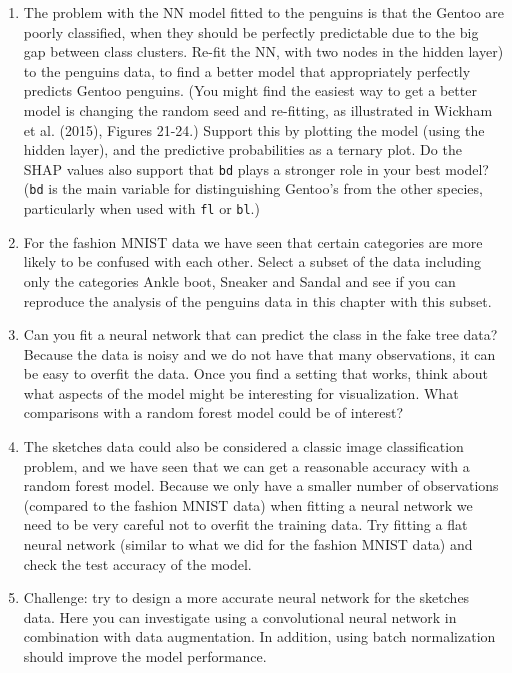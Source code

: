 \documentclass[
  letterpaper,
]{krantz}
\providecommand{\tightlist}{%
  \setlength{\itemsep}{0pt}\setlength{\parskip}{0pt}}
\begin{document}
\begin{enumerate}
\def\labelenumi{\arabic{enumi}.}
\tightlist
\item
  The problem with the NN model fitted to the penguins is that the
  Gentoo are poorly classified, when they should be perfectly
  predictable due to the big gap between class clusters. Re-fit the NN,
  with two nodes in the hidden layer) to the penguins data, to find a
  better model that appropriately perfectly predicts Gentoo penguins.
  (You might find the easiest way to get a better model is changing the
  random seed and re-fitting, as illustrated in Wickham et al. (2015),
  Figures 21-24.) Support this by plotting the model (using the hidden
  layer), and the predictive probabilities as a ternary plot. Do the
  SHAP values also support that \texttt{bd} plays a stronger role in
  your best model? (\texttt{bd} is the main variable for distinguishing
  Gentoo's from the other species, particularly when used with
  \texttt{fl} or \texttt{bl}.)
\item
  For the fashion MNIST data we have seen that certain categories are
  more likely to be confused with each other. Select a subset of the
  data including only the categories Ankle boot, Sneaker and Sandal and
  see if you can reproduce the analysis of the penguins data in this
  chapter with this subset.
\item
  Can you fit a neural network that can predict the class in the fake
  tree data? Because the data is noisy and we do not have that many
  observations, it can be easy to overfit the data. Once you find a
  setting that works, think about what aspects of the model might be
  interesting for visualization. What comparisons with a random forest
  model could be of interest?
\item
  The sketches data could also be considered a classic image
  classification problem, and we have seen that we can get a reasonable
  accuracy with a random forest model. Because we only have a smaller
  number of observations (compared to the fashion MNIST data) when
  fitting a neural network we need to be very careful not to overfit the
  training data. Try fitting a flat neural network (similar to what we
  did for the fashion MNIST data) and check the test accuracy of the
  model.
\item
  Challenge: try to design a more accurate neural network for the
  sketches data. Here you can investigate using a convolutional neural
  network in combination with data augmentation. In addition, using
  batch normalization should improve the model performance.
\end{enumerate}
\end{document}

